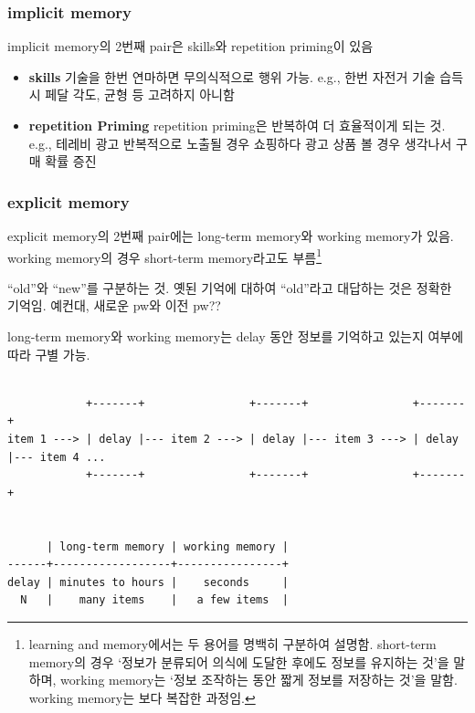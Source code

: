 \documentclass[../note.tex]{subfiles}
\begin{document}
\subsubsection{implicit memory}
implicit memory의 2번째 pair은 skills와 repetition priming이 있음

\begin{itemize}
  \item{\textbf{skills}}
    기술을 한번 연마하면 무의식적으로 행위 가능. e.g., 한번 자전거 기술 습득시 페달 각도, 균형 등 고려하지 아니함

  \item{\textbf{repetition Priming}}
    repetition priming은 반복하여 더 효율적이게 되는 것. e.g., 테레비 광고 반복적으로 노출될 경우 쇼핑하다 광고 상품 볼 경우 생각나서 구매 확률 증진
\end{itemize}

\subsubsection{explicit memory}
explicit memory의 2번째 pair에는 long-term memory와 working memory가 있음.
working memory의 경우 short-term memory라고도 부름\footnote{learning and memory에서는 두 용어를 명백히 구분하여 설명함. short-term memory의 경우 `정보가 분류되어 의식에 도달한 후에도 정보를 유지하는 것'을 말하며, working memory는 `정보 조작하는 동안 짧게 정보를 저장하는 것'을 말함. working memory는 보다 복잡한 과정임.}

\begin{definition}
  ``old''와 ``new''를 구분하는 것. 옛된 기억에 대하여 ``old''라고 대답하는 것은 정확한 기억임. 예컨대, 새로운 pw와 이전 pw??
\end{definition}
long-term memory와 working memory는 delay 동안 정보를 기억하고 있는지 여부에 따라 구별 가능.

\begin{center}
  \small
  \begin{spacing}{0.8}
    \begin{BVerbatim}

            +-------+                +-------+                +-------+
item 1 ---> | delay |--- item 2 ---> | delay |--- item 3 ---> | delay |--- item 4 ...
            +-------+                +-------+                +-------+


      | long-term memory | working memory |
------+------------------+----------------+
delay | minutes to hours |    seconds     |
  N   |    many items    |   a few items  |
    \end{BVerbatim}
  \end{spacing}
\end{center}
\end{document}
